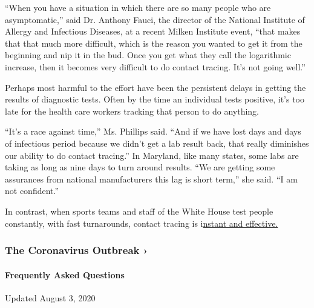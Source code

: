 ``When you have a situation in which there are so many people who are
asymptomatic,'' said Dr. Anthony Fauci, the director of the National
Institute of Allergy and Infectious Diseases, at a recent Milken
Institute event, ``that makes that that much more difficult, which is
the reason you wanted to get it from the beginning and nip it in the
bud. Once you get what they call the logarithmic increase, then it
becomes very difficult to do contact tracing. It's not going well.''

Perhaps most harmful to the effort have been the persistent delays in
getting the results of diagnostic tests. Often by the time an individual
tests positive, it's too late for the health care workers tracking that
person to do anything.

``It's a race against time,'' Ms. Phillips said. ``And if we have lost
days and days of infectious period because we didn't get a lab result
back, that really diminishes our ability to do contact tracing.'' In
Maryland, like many states, some labs are taking as long as nine days to
turn around results. ``We are getting some assurances from national
manufacturers this lag is short term,'' she said. ``I am not
confident.''

In contrast, when sports teams and staff of the White House test people
constantly, with fast turnarounds, contact tracing is
i\href{https://www.nbcnews.com/politics/white-house/white-house-executive-office-cafeteria-closed-after-positive-coronavirus-test-n1234662?cid=sm_npd_nn_tw_ma}{nstant
and effective.}

\href{https://www.nytimes.com/news-event/coronavirus?action=click\&pgtype=Article\&state=default\&region=MAIN_CONTENT_3\&context=storylines_faq}{}

\hypertarget{the-coronavirus-outbreak-}{%
\subsubsection{The Coronavirus Outbreak
›}\label{the-coronavirus-outbreak-}}

\hypertarget{frequently-asked-questions}{%
\paragraph{Frequently Asked
Questions}\label{frequently-asked-questions}}

Updated August 3, 2020

